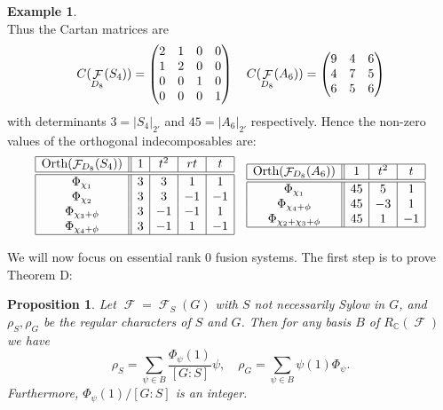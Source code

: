 \documentclass[12pt]{article}
\DeclareMathOperator{\C}{\mathbb{C}}
\DeclareMathOperator{\sF}{\mathcal{F}}
\theoremstyle{plain}
\newtheorem{prop}[thm]{Proposition}
\theoremstyle{definition}
\newtheorem{example}[thm]{Example}
\begin{document}
\begin{example}
\[\]\normalsize
Thus the Cartan matrices are
\[C(\sF_{D_8}(S_4)) = \small \begin{pmatrix} 2 & 1 & 0 & 0 \\ 1 & 2 & 0 & 0 \\ 0 & 0 &1 & 0\\ 0 & 0 & 0 & 1 \end{pmatrix} \normalsize \quad C(\sF_{D_8}(A_6)) = 
\small\begin{pmatrix} 9 & 4 & 6 \\ 4 & 7 & 5 \\ 6 & 5 & 6 \end{pmatrix} \normalsize
\]
with determinants $3 = |S_4|_{2'}$ and $45 = |A_6|_{2'}$ respectively. Hence the non-zero values of the orthogonal indecomposables are:
\small\[
\begin{array}{|c||c|c|c|c|}\hline
\text{Orth}(\sF_{D_8}(S_4)) & 1 & t^2 & rt & t \\   \hline\hline
\Phi_{\chi_1} & 3 & 3 & 1 & 1 \\
\Phi_{\chi_2} & 3 & 3 & -1 & -1 \\
\Phi_{\chi_3+\phi} & 3 & -1 & -1 & 1 \\
\Phi_{\chi_4+\phi}& 3 & -1 & 1 & -1 \\\hline
\end{array} \quad
\begin{array}{|c||c|c|c|} \hline
\text{Orth}(\sF_{D_8}(A_6)) & 1 & t^2 & t \\ \hline\hline
\Phi_{\chi_1} & 45 & 5 & 1 \\
\Phi_{\chi_4+\phi} & 45 & -3 & 1 \\
\Phi_{\chi_2+\chi_3+\phi} & 45 & 1 & -1 \\ \hline
\end{array}
\] \normalsize
\end{example}
We will now focus on essential rank $0$ fusion systems. The first step is to prove Theorem D:
\begin{prop}\label{regular character}
Let $\sF = \sF_S(G)$ with $S$ not necessarily Sylow in $G$, and $\rho_S, \rho_G$ be the regular characters of $S$ and $G$. Then for any basis $B$ of $R_{\C}(\sF)$ we have
\[\rho_S = \sum_{\psi \in B} \frac{\Phi_{\psi}(1)}{[G:S]}\psi, \quad \rho_G = \sum_{\psi \in B} \psi(1)\Phi_{\psi}.\]
Furthermore, $\Phi_{\psi}(1)/[G:S]$ is an integer.
\end{prop}
\end{document}
